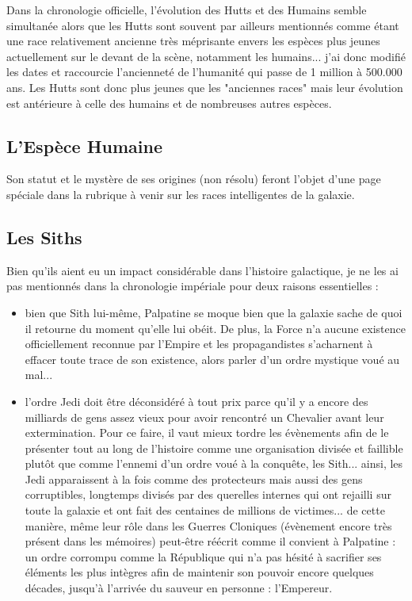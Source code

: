 \documentclass[twoside]{article}
\begin{document}
Dans la chronologie officielle, l'évolution des Hutts et des Humains semble simultanée alors que les Hutts sont souvent par ailleurs mentionnés  comme étant une race relativement ancienne très méprisante envers les espèces plus jeunes actuellement sur le devant de la scène, notamment les humains... j'ai donc modifié les dates et raccourcie l'ancienneté de l'humanité qui passe de 1 million à 500.000 ans. Les Hutts sont donc plus jeunes que les "anciennes races" mais leur évolution est antérieure à celle des humains et de nombreuses autres espèces. 

\subsection{L'Espèce Humaine}
Son statut et le mystère de ses origines (non résolu) feront l'objet d'une page spéciale dans la rubrique à venir sur les races intelligentes de la galaxie.  

\subsection{Les Siths}
Bien qu'ils aient eu un impact considérable dans l'histoire galactique, je ne les ai pas mentionnés dans la chronologie impériale pour deux raisons essentielles : 
\begin{itemize}
	\item bien que Sith lui-même, Palpatine se moque bien que la galaxie sache de quoi il retourne du moment qu'elle lui obéit. De plus, la Force n'a aucune existence officiellement reconnue par l'Empire et les propagandistes s'acharnent à effacer toute trace de son existence, alors parler d'un ordre mystique voué au mal...
	\item l'ordre Jedi doit être déconsidéré à tout prix parce qu'il y a encore des milliards de gens assez vieux pour avoir rencontré un Chevalier avant leur extermination. Pour ce faire, il vaut mieux tordre les évènements afin de le présenter tout au long de l'histoire comme une organisation divisée et faillible plutôt que comme l'ennemi d'un ordre voué à la conquête, les Sith... ainsi, les Jedi apparaissent à la fois comme des protecteurs mais aussi des gens corruptibles, longtemps divisés par des querelles internes qui ont rejailli sur toute la galaxie et ont fait des centaines de millions de victimes... de cette manière, même leur rôle dans les Guerres Cloniques (évènement encore très présent dans les mémoires) peut-être réécrit comme il convient à Palpatine : un ordre corrompu comme la République qui n'a pas hésité à sacrifier ses éléments les plus intègres afin de maintenir son pouvoir encore quelques décades, jusqu'à l'arrivée du sauveur en personne : l'Empereur. 
\end{itemize}
\end{document}
